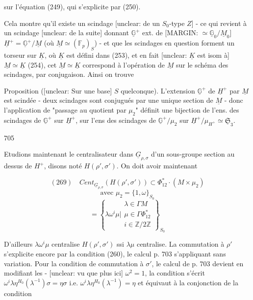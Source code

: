 \newpage


sur l'équation (249), qui s'explicite par (250).

Cela montre qu'il existe un scindage
[unclear: de un $S_0$-type $Z$] - ce qui revient à un
scindage [unclear: de la suite] donnant $\underline{\mathbb{G}}^+$ ext. de
[MARGIN: $\simeq \underline{\mathbb{G}}_0 / \underline{M}_0$] $\underline{H}^+ = \underline{\mathbb{G}}^+ / \underline{M}$ (où $\underline{M} \simeq (\mathbb{F}_p)_S$) - et que
les scindages en question forment un
torseur sur $\underline{K}$, où $\underline{K}$ est défini dans
(253), et en fait [unclear: $\underline{K}$ est isom à]
$\underline{M} \simeq \underline{K}$ (254), cet $\underline{M} \simeq \underline{K}$ correspond
à l'opération de $\underline{M}$ sur le schéma des
scindages, par conjugaison. Ainsi on trouve

Proposition ([unclear: Sur une base] $S$ quelconque).
L'extension $\underline{\mathbb{G}}^+$ de $\underline{H}^+$ par $\underline{M}$
est scindée - deux scindages sont
conjugués par une unique section
de $\underline{M}$ - donc l'application de
"passage au quotient par $\mu_2$" définit une
bijection de l'ens. des scindages
de $\underline{\mathbb{G}}^+$ sur $\underline{H}^+$, sur l'ens des
scindages de $\underline{\mathbb{G}}^+ / \mu_2$ sur $\underline{H}^+ / \mu_{H^+} \simeq \underline{\mathfrak{S}}_3$.

\newpage


705

Etudions maintenant le centralisateur
dans $\underline{G}_{\rho,\sigma}$ d'un sous-groupe section
au dessus de $H^+$, disons noté $H(\rho',\sigma')$.
On doit avoir maintenant

$$ (269) \quad Cent_{\underline{G}_{\rho,\sigma}} (H(\rho',\sigma')) \subset \Phi_{12}^* \cdot (M \times \mu_2) $$
$$ \text{avec } \mu_2 = \{1, \omega\}_{S_0} $$
$$ = \left\{ \lambda \omega^i \mu \Big| \begin{array}{l} \lambda \in \Gamma M \\ \mu \in \Gamma \Phi_{12}^* \\ i \in \mathbb{Z}/2\mathbb{Z} \end{array} \right\}_{S_0} $$

D'ailleurs $\lambda \omega^i \mu$ centralise $H(\rho',\sigma')$ ssi $\lambda \mu$ centralise. La commutation à $\rho'$
s'explicite encore par la condition (260),
le calcul p. 703 s'appliquant sans variation. Pour
la condition de commutation à $\sigma'$, le
calcul de p. 703 devient en modifiant les
- [unclear: vu que plus ici] $\omega^2 = 1$, la condition
s'écrit
$\omega^i \lambda \eta^{H_0}(\lambda^{-1}) \sigma = \eta \sigma$ i.e. $\omega^i \lambda \eta^{H_0}(\lambda^{-1}) = \eta$
et équivaut à la conjonction de la
condition

